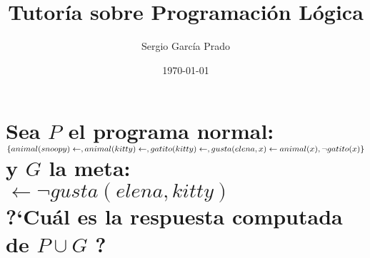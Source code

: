 \documentclass[10pt, a4paper,spanish]{article}
\title{\vspace{-15mm}\fontsize{24.88pt}{10pt}\textbf{Tutoría sobre Programación Lógica}} %
\author{Sergio García Prado}
\date{\today}
\begin{document}
	\maketitle %

	\thispagestyle{fancy} %


	\section{Sea $P$ el programa normal: \\
		$\{ \\
		animal(snoopy) \gets, \\
		animal(kitty) \gets, \\
		gatito(kitty) \gets, \\
		gusta(elena,x) \gets animal(x), \neg gatito(x) \\
		\}\\$
		y $G$ la meta: \\
		$\gets \neg gusta(elena,kitty)$\\
		?`Cuál es la respuesta computada de $P \cup {G}$ ?}

		\paragraph{}
\end{document}
